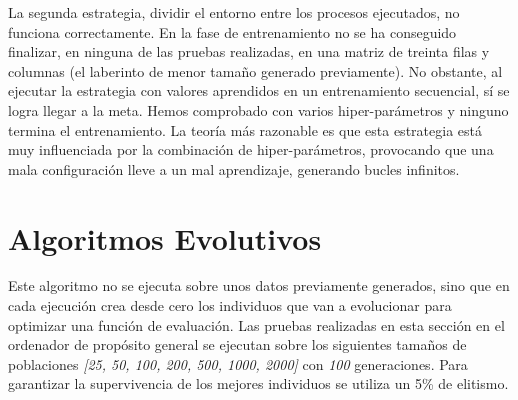 La segunda estrategia, dividir el entorno entre los procesos ejecutados, no funciona correctamente. En la fase de entrenamiento no se ha conseguido finalizar, en ninguna de las pruebas realizadas, en una matriz de treinta filas y columnas (el laberinto de menor tamaño generado previamente). No obstante, al ejecutar la estrategia con valores aprendidos en un entrenamiento secuencial, sí se logra llegar a la meta. Hemos comprobado con varios hiper-parámetros y ninguno termina el entrenamiento. La teoría más razonable es que esta estrategia está muy influenciada por la combinación de hiper-parámetros, provocando que una mala configuración lleve a un mal aprendizaje, generando bucles infinitos.








\section{Algoritmos Evolutivos}

Este algoritmo no se ejecuta sobre unos datos previamente generados, sino que en cada ejecución crea desde cero los individuos que van a evolucionar para optimizar una función de evaluación. Las pruebas realizadas en esta sección en el ordenador de propósito general se ejecutan sobre los siguientes tamaños de poblaciones \textit{[25, 50, 100, 200, 500, 1000, 2000]} con \textit{100} generaciones. Para garantizar la supervivencia de los mejores individuos se utiliza un 5\% de elitismo. 

